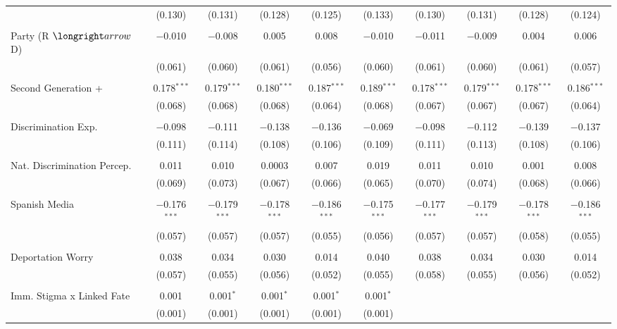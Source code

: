 \begin{table}[!htbp]
\begin{tabular}{@{\extracolsep{5pt}}lccccccccc}
  & (0.130) & (0.131) & (0.128) & (0.125) & (0.133) & (0.130) & (0.131) & (0.128) & (0.124) \\ 
  & & & & & & & & & \\ 
 Party (R $\longright arrow$ D) & $-$0.010 & $-$0.008 & 0.005 & 0.008 & $-$0.010 & $-$0.011 & $-$0.009 & 0.004 & 0.006 \\ 
  & (0.061) & (0.060) & (0.061) & (0.056) & (0.060) & (0.061) & (0.060) & (0.061) & (0.057) \\ 
  & & & & & & & & & \\ 
 Second Generation + & 0.178$^{***}$ & 0.179$^{***}$ & 0.180$^{***}$ & 0.187$^{***}$ & 0.189$^{***}$ & 0.178$^{***}$ & 0.179$^{***}$ & 0.178$^{***}$ & 0.186$^{***}$ \\ 
  & (0.068) & (0.068) & (0.068) & (0.064) & (0.068) & (0.067) & (0.067) & (0.067) & (0.064) \\ 
  & & & & & & & & & \\ 
 Discrimination Exp. & $-$0.098 & $-$0.111 & $-$0.138 & $-$0.136 & $-$0.069 & $-$0.098 & $-$0.112 & $-$0.139 & $-$0.137 \\ 
  & (0.111) & (0.114) & (0.108) & (0.106) & (0.109) & (0.111) & (0.113) & (0.108) & (0.106) \\ 
  & & & & & & & & & \\ 
 Nat. Discrimination Percep. & 0.011 & 0.010 & 0.0003 & 0.007 & 0.019 & 0.011 & 0.010 & 0.001 & 0.008 \\ 
  & (0.069) & (0.073) & (0.067) & (0.066) & (0.065) & (0.070) & (0.074) & (0.068) & (0.066) \\ 
  & & & & & & & & & \\ 
 Spanish Media & $-$0.176$^{***}$ & $-$0.179$^{***}$ & $-$0.178$^{***}$ & $-$0.186$^{***}$ & $-$0.175$^{***}$ & $-$0.177$^{***}$ & $-$0.179$^{***}$ & $-$0.178$^{***}$ & $-$0.186$^{***}$ \\ 
  & (0.057) & (0.057) & (0.057) & (0.055) & (0.056) & (0.057) & (0.057) & (0.058) & (0.055) \\ 
  & & & & & & & & & \\ 
 Deportation Worry & 0.038 & 0.034 & 0.030 & 0.014 & 0.040 & 0.038 & 0.034 & 0.030 & 0.014 \\ 
  & (0.057) & (0.055) & (0.056) & (0.052) & (0.055) & (0.058) & (0.055) & (0.056) & (0.052) \\ 
  & & & & & & & & & \\ 
 Imm. Stigma x Linked Fate & 0.001 & 0.001$^{*}$ & 0.001$^{*}$ & 0.001$^{*}$ & 0.001$^{*}$ &  &  &  &  \\ 
  & (0.001) & (0.001) & (0.001) & (0.001) & (0.001) &  &  &  &  \\ 

\end{tabular}
\end{table}
